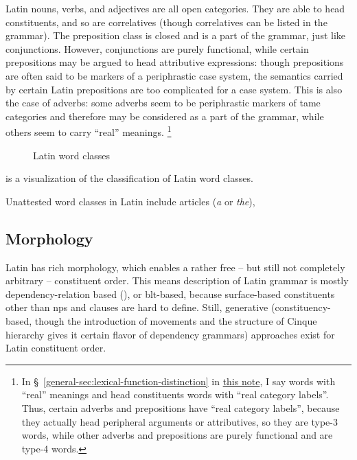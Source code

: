 \documentclass{article}
\newcommand*{\citesec}[1]{\S~{#1}}
\newcommand*{\corpus}[1]{\emph{#1}}
\newcommand{\general}{\href{../methodology/glossing.pdf}{this note}}
\begin{document}
Latin nouns, verbs, and adjectives are all open categories.
They are able to head constituents,
and so are correlatives (though correlatives can be listed in the grammar).
The preposition class is closed and is a part of the grammar,
just like conjunctions.
However, conjunctions are purely functional,
while certain prepositions may be argued to head attributive expressions:
though prepositions are often said to be markers of a periphrastic case system,
the semantics carried by certain Latin prepositions are too complicated for a case system.
This is also the case of adverbs:
some adverbs seem to be periphrastic markers of \acs{tame} categories
and therefore may be considered as a part of the grammar,
while others seem to carry ``real'' meanings.%
\footnote{
    In \citesec{\ref{general-sec:lexical-function-distinction}} in \general, 
    I say words with ``real'' meanings and head constituents 
    words with ``real category labels''.
    Thus, certain adverbs and prepositions have ``real category labels'',
    because they actually head peripheral arguments or attributives,
    so they are type-3 words,
    while other adverbs and prepositions are purely functional and are type-4 words.
}

\begin{figure}
    \centering
    
    \caption{Latin word classes}
    \label{fig:latin-word-class}
\end{figure}

 is a visualization of the classification of Latin word classes.

Unattested word classes in Latin include 
articles (\corpus{a} or \corpus{the}), %

\subsection{Morphology}

Latin has rich morphology,
which enables a rather free -- but still not completely arbitrary -- constituent order.
This means description of Latin grammar is mostly dependency-relation based 
(),
or \acs{blt}-based,
because surface-based constituents other than \acs{np}s and clauses are hard to define.
Still, generative (constituency-based, 
though the introduction of movements and the structure of Cinque hierarchy
gives it certain flavor of dependency grammars) approaches exist for Latin constituent order.
\end{document}
